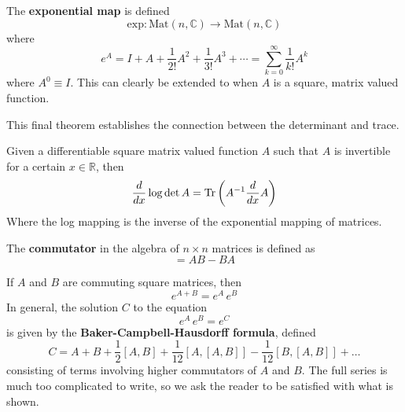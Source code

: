   \begin{definition}
    The \textbf{exponential map} is defined
    \begin{equation}
      \text{exp}: \text{Mat}(n, \mathbb{C}) \to \text{Mat}(n, \mathbb{C})
    \end{equation}
    where 
    \begin{equation}
      e^A = I + A + \frac{1}{2!} A^2 + \frac{1}{3!} A^3 + \cdots = \sum_{k=0}^\infty \frac{1}{k!} A^k
    \end{equation}
    where $A^0 \equiv I$. This can clearly be extended to when $A$ is a square, matrix valued function. 
  \end{definition}

  This final theorem establishes the connection between the determinant and trace. 

  \begin{theorem}
    Given a differentiable square matrix valued function $A$ such that $A$ is invertible for a certain $x \in \mathbb{R}$, then 
    \begin{equation}
      \frac{d}{d x} \log{\det{A}} = \operatorname{Tr} \bigg( A^{-1} \frac{d}{d x} A \bigg)
    \end{equation}
    Where the log mapping is the inverse of the exponential mapping of matrices. 
  \end{theorem}

  \begin{definition}
    The \textbf{commutator} in the algebra of $n \times n$ matrices is defined as 
    \begin{equation}
      [A, B] = A B - B A
    \end{equation}
  \end{definition}

  \begin{theorem}
    If $A$ and $B$ are commuting square matrices, then 
    \begin{equation}
      e^{A + B} = e^A \, e^B
    \end{equation}
    In general, the solution $C$ to the equation
    \begin{equation}
      e^{A} \, e^B = e^C
    \end{equation}
    is given by the \textbf{Baker-Campbell-Hausdorff formula}, defined
    \begin{equation}
      C = A + B + \frac{1}{2}[A,B] + \frac{1}{12} [A,[A,B]] - \frac{1}{12} [B,[A,B]] + \ldots
    \end{equation}
    consisting of terms involving higher commutators of $A$ and $B$. The full series is much too complicated to write, so we ask the reader to be satisfied with what is shown. 
  \end{theorem}

